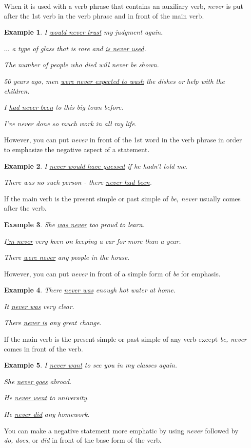 \documentclass[oneside]{book}
\numberwithin{equation}{section}
\newtheorem{example}{Example}[section]
\begin{document}
%
When it is used with a verb phrase that contains an auxiliary verb, \textit{never} is put after the 1st verb in the verb phrase and in front of the main verb.
\begin{example}
    I \underline{would never trust} my judgment again.
    
    $\ldots$ a type of glass that is rare and \underline{is never used}.
    
    The number of people who died \underline{will never be shown}.
    
    50 years ago, men \underline{were never expected to wash} the dishes or help with the children.
    
    I \underline{had never been} to this big town before.
    
    I\underline{'ve never done} so much work in all my life.
\end{example}
However, you can put \textit{never} in front of the 1st word in the verb phrase in order to emphasize the negative aspect of a statement.
\begin{example}
    I \underline{never would have guessed} if he hadn't told me.
    
    There was no such person - there \underline{never had been}.
\end{example}
%
\noindent{} If the main verb is the present simple or past simple of \textit{be, never} usually comes after the verb.
\begin{example}
    She \underline{was never} too proud to learn.
    
    I\underline{'m never} very keen on keeping a car for more than a year.
    
    There \underline{were never} any people in the house.
\end{example}
However, you can put \textit{never} in front of a simple form of \textit{be} for emphasis.
\begin{example}
    There \underline{never was} enough hot water at home.
    
    It \underline{never was} very clear.
    
    There \underline{never is} any great change.
\end{example}
%
\noindent{} If the main verb is the present simple or past simple of any verb except \textit{be, never} comes in front of the verb.
\begin{example}
    I \underline{never want} to see you in my classes again.
    
    She \underline{never goes} abroad.
    
    He \underline{never went} to university.
    
    He \underline{never did} any homework.
\end{example}
%
\noindent{} You can make a negative statement more emphatic by using \textit{never} followed by \textit{do, does}, or \textit{did} in front of the base form of the verb.
\end{document}
